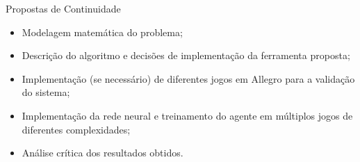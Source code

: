 \documentclass[aspectratio=169]{beamer}
\begin{document}
\begin{frame}{Propostas de Continuidade}
	\begin{block}{}
		\begin{itemize}
			\item Modelagem matemática do problema;
			\item Descrição do algoritmo e decisões de implementação da ferramenta proposta;
			\item Implementação (se necessário) de diferentes jogos em Allegro para a validação do sistema;
			\item Implementação da rede neural e treinamento do agente em múltiplos jogos de diferentes complexidades;
			\item Análise crítica dos resultados obtidos.
		\end{itemize}
	\end{block}
\end{frame}



 
 
 

\end{document}
